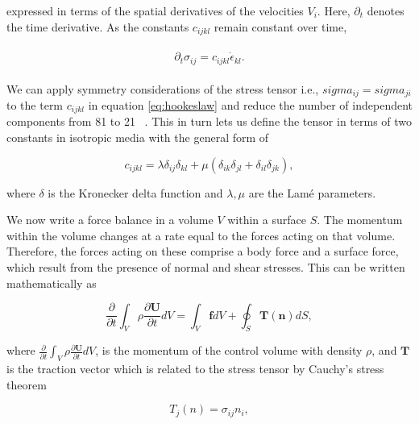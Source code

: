 expressed in terms of the spatial derivatives of the velocities $V_i$. Here, $\partial_t$ denotes the time derivative. As the constants $c_{ijkl}$ remain constant over time,

\begin{align}
    \begin{split}
        \partial_t \sigma_{ij} = c_{ijkl}\dot{\epsilon}_{kl} .
    \end{split}
    \label{eq:stress}
\end{align}

We can apply symmetry considerations of the stress tensor i.e., $sigma_{ij} = sigma_{ji}$ to the term $c_{ijkl}$ in equation \ref{eq:hookeslaw} and reduce the number of independent components from 81 to 21 ~\parencite[Cha. 2]{aki2002quantitative}.
This in turn lets us define the tensor in terms of two constants in isotropic media with the general form of

\begin{equation}
    c_{ijkl} = \lambda \delta_{ij}\delta_{kl} + \mu\left(\delta_{ik}\delta_{jl} + \delta_{il}\delta_{jk}\right),
    \label{eq:isotropic}
\end{equation}

where $\delta$ is the Kronecker delta function and $\lambda, \mu$ are the Lam\'e parameters.

We now write a force balance in a volume $V$ within a surface $S$. The momentum within the volume changes at a rate equal
to the forces acting on that volume. Therefore, the forces acting on these comprise a body force and a surface force, which result
from the presence of normal and shear stresses. This can be written mathematically as 

\begin{equation}
    \frac{\partial}{\partial t} \int_V \rho \frac{\partial \mathbf{U}}{\partial t}dV = \int_V \mathbf{f}dV + \oint_S \mathbf{T\left(n\right)}dS,
    \label{eq:forcebalance}
\end{equation}

where $\frac{\partial}{\partial t} \int_V \rho \frac{\partial \mathbf{U}}{\partial t}dV$, is the momentum of the control volume with density $\rho$, and $\mathbf{T}$
is the traction vector which is related to the stress tensor by Cauchy's stress theorem %

\begin{equation}
    T_j\left(n\right) = \sigma_{ij}n_i,
    \label{eq:tractionvector}
\end{equation}

